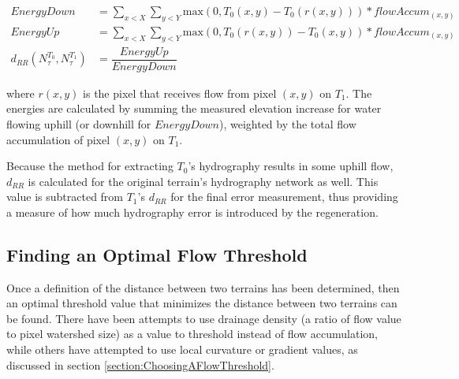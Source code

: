 \begin{align}
  \label{equation:EnergyDown}
  EnergyDown & = \displaystyle\sum_{x < X} \displaystyle\sum_{y < Y} \text{max} \left( 0, T_{0}\left(x,y\right) - T_{0}\left(r\left(x,y\right)\right) \right) * flowAccum_{\left(x,y\right)} \\
  EnergyUp & = \displaystyle\sum_{x < X} \displaystyle\sum_{y < Y} \text{max} \left( 0, T_{0}\left(r\left(x,y\right)\right) - T_{0}\left(x,y\right) \right) * flowAccum_{\left(x,y\right)} \\
% 
  d_{RR} \left( N^{T_{0}}_{\tau}, N^{T_{1}}_{\tau} \right) & = \dfrac{EnergyUp}{EnergyDown}
\end{align}

\noindent where $r\left(x,y\right)$ is the pixel that receives flow from pixel $\left(x,y\right)$ on $T_{1}$. The energies are calculated by summing the measured elevation increase for water flowing uphill (or downhill for $EnergyDown$), weighted by the total flow accumulation of pixel $\left(x,y\right)$ on $T_{1}$. 

Because the method for extracting $T_{0}$'s hydrography results in some uphill flow, $d_{RR}$ is calculated for the original terrain's hydrography network as well. This value is subtracted from $T_{1}$'s $d_{RR}$ for the final error measurement, thus providing a measure of how much hydrography error is introduced by the regeneration.


\subsection{Finding an Optimal Flow Threshold}

Once a definition of the distance between two terrains has been determined, then an optimal threshold value that minimizes the distance between two terrains can be found. 
% 
There have been attempts to use drainage density (a ratio of flow value to pixel watershed size) as a value to threshold instead of flow accumulation, while others have attempted to use local curvature or gradient values, as discussed in section \ref{section:ChoosingAFlowThreshold}. 


